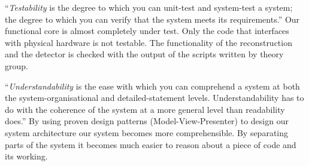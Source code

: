 \documentclass[a4paper, openany, oneside]{memoir}
\begin{document}
``\textit{Testability} is the degree to which you can unit-test and system-test a system; the degree to which you can verify that the system meets its requirements.'' Our functional core is almost completely under test. Only the code that interfaces with physical hardware is not testable. The functionality of the reconstruction and the detector is checked with the output of the \matlab{} scripts written by theory group.

``\textit{Understandability} is the ease with which you can comprehend a system at both the system-organisational and detailed-statement levels. Understandability has to do with the coherence of the system at a more general level than readability does.'' By using proven design patterns (Model-View-Presenter) to design our system architecture our system becomes more comprehensible. By separating parts of the system it becomes much easier to reason about a piece of code and its working.




\end{document}
